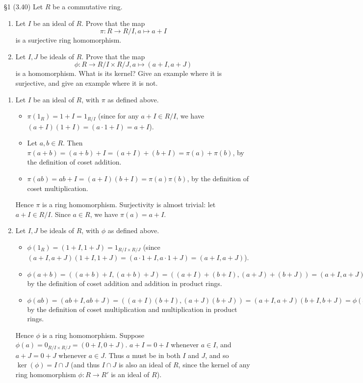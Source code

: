 \documentclass{homework}
\begin{document}
\begin{problem}{\S 1}
  (3.40) Let $R$ be a commutative ring.
  \begin{enumerate}[label=(\alph*)]
    \item Let $I$ be an ideal of $R$. Prove that the map \[
        \pi: R \longrightarrow R / I, a\longmapsto a+I
      \] is a surjective ring homomorphism.
    \item Let $I,J$ be ideals of $R$. Prove that the map \[
        \phi: R \longrightarrow R / I \times  R / J, a\longmapsto (a+I,a+J)
      \] is a homomorphism. What is its kernel? Give an example where it is surjective, and give an
      example where it is not.
  \end{enumerate}
\end{problem}

\begin{solution}
  \begin{enumerate}[label=(\alph*)]
    \item 
      Let $I$ be an ideal of $R$, with $\pi$ as defined above.
      \begin{itemize}
        \item $\pi(1_R)=1+I=1_{R / I}$ (since for any $a+I\in R / I$, we have $(a+I)(1+I)=(a\cdot
          1+I)=a+I$).
        \item Let $a,b\in R$. Then $\pi(a+b)=(a+b)+I=(a+I)+(b+I)=\pi(a)+\pi(b)$, by the definition of
          coset addition.
        \item $\pi(ab)=ab+I=(a+I)(b+I)=\pi(a)\pi(b)$, by the definition of coset multiplication.
      \end{itemize}
      Hence $\pi$ is a ring homomorphism. Surjectivity is almost trivial: let $a+I \in R / I$. Since
      $a\in R$, we have $\pi(a)=a+I$.
    \item Let $I,J$ be ideals of $R$, with $\phi$ as defined above.
      \begin{itemize}
        \item $\phi(1_R)=(1+I,1+J)=1_{R/I \times  R / J}$ (since $(a+I,a+J)(1+I,1+J)=(a\cdot
          1+I,a\cdot 1+J)=(a+I,a+J)$).
        \item
          $\phi(a+b)=((a+b)+I,(a+b)+J)=((a+I)+(b+I),(a+J)+(b+J))=(a+I,a+J)+(b+I,b+J)=\phi(a)+\phi(b)$
          by the definition of coset addition and addition in product rings.
        \item $\phi(ab)=(ab+I,ab+J)=((a+I)(b+I),(a+J)(b+J))=(a+I,a+J)(b+I,b+J)=\phi(a)\phi(b)$ by
          the definition of coset multiplication and multiplication in product rings.
      \end{itemize}
      Hence $\phi$ is a ring homomorphism. Suppose $\phi(a)=0_{R / I \times R / J}=(0+I,0+J)$.
      $a+I=0+I$ whenever $a\in I$, and $a+J=0+J$ whenever $a\in J$. Thus $a$ must be in both $I$ and
      $J$, and so $\ker(\phi)=I\cap J$ (and thus $I\cap J$ is also an ideal of $R$, since the kernel
      of any ring homomorphism $\phi: R\to R'$ is an ideal of $R$).


\end{enumerate}
\end{solution}
\end{document}
